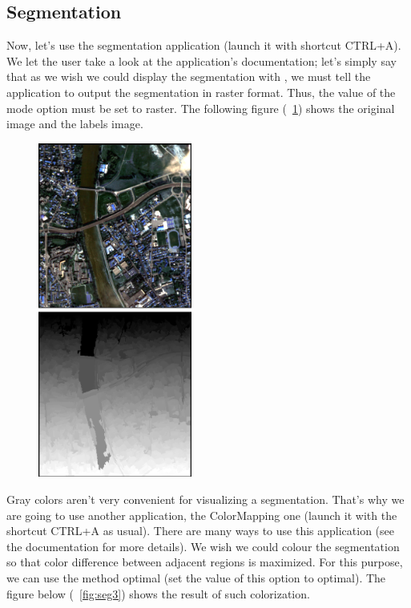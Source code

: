 \subsection{Segmentation}\label{ssec:monseg}

Now, let's use the segmentation application (launch it with shortcut CTRL+A). 
We let the user take a look at the application's documentation; let's simply say that as we wish we could display the segmentation with \mont,
we must tell the application to output the segmentation in raster format. Thus, the value of the mode option must be set to raster.
The following figure (~\ref{fig:seg12}) shows the original image and the labels image.

\begin{figure}[!h] 
  \center
  \includegraphics[width=0.45\textwidth]{../Art/MonteverdiImages/seg1-2.png}
  \label{fig:seg12}
\end{figure}


Gray colors aren't very convenient for visualizing a segmentation. That's why we are going to use another application, the ColorMapping one (launch it with the shortcut CTRL+A as usual).
There are many ways to use this application (see the documentation for more details). We wish we could colour the segmentation so that color difference between adjacent regions is maximized.
For this purpose, we can use the method optimal (set the value of this option to optimal). The figure below (~\ref{fig:seg3}) shows the result of such colorization.

